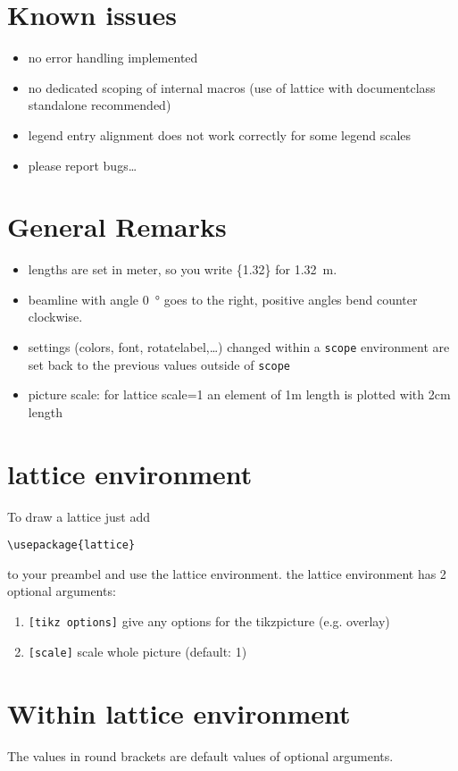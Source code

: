 \documentclass[colorlinks]{scrartcl}
\begin{document}
\section{Known issues}
\label{sec-3}
\begin{itemize}
\item no error handling implemented
\item no dedicated scoping of internal macros (use of lattice with documentclass standalone recommended)
\item legend entry alignment does not work correctly for some legend scales
\item please report bugs\ldots{}
\end{itemize}

\section{General Remarks}
\label{sec-6}
\begin{itemize}
\item lengths are set in meter, so you write \{1.32\} for \SI{1.32}{\m}.
\item beamline with angle \SI{0}{\degree} goes to the right, positive angles bend counter clockwise.
\item settings (colors, font, rotatelabel,\ldots{}) changed within a \verb+scope+ environment are set back to the previous values outside of \verb+scope+
\item picture scale: for lattice scale=1 an element of 1m length is plotted with 2cm length
\end{itemize}

\section{lattice environment}
\label{sec-4}
To draw a lattice just add
\begin{verbatim}
\usepackage{lattice}
\end{verbatim}
to your preambel and use the lattice environment.
the lattice environment has 2 optional arguments:
\begin{enumerate}
\item \verb+[tikz options]+ give any options for the tikzpicture (e.g. overlay)
\item \verb+[scale]+ scale whole picture (default: 1)
\end{enumerate}
\section{Within lattice environment}
\label{sec-5}
The values in round brackets are default values of optional arguments.
\end{document}
